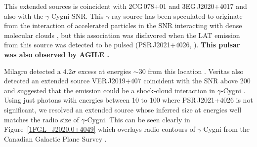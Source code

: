\documentclass[12pt,preprint]{aastex}
\newcommand{\gev}{\text{GeV}\xspace}
\newcommand{\tev}{\text{TeV}\xspace}
\newcommand{\newtext}[1]{{\bfseries \color{red}#1}}
\begin{document}
This extended sources is coincident with 2CG\,078+01 and
3EG\,J2020+4017 \citep{second_cos_b_catalog,third_egret_catalog}
and also with the $\gamma$-Cygni SNR. This $\gamma$-ray source has
been speculated to originate from the interaction of accelerated
particles in the SNR interacting with dense molecular clouds
\citep{pollock_1985,gaisser_1998},  but this association was disfavored
when the LAT \gev emission from this source was detected to be pulsed
(PSR\,J2021+4026, \cite{first_lat_pulsar_cat}). 
\newtext{
This
pulsar was also observed by AGILE \citep{gamma_cygni_agile}.
}


Milagro detected a $4.2\sigma$ excess at energies $\sim 30$ \tev
from this location \citep{lat_bsl,milagro_bright_source_list}.
Veritas also detected an extended source VER\,J2019+407 coincident
with the SNR above 200 \gev and suggested that the \tev emission could be a
shock-cloud interaction in $\gamma$-Cygni \citep{veritas_gamma_cygni}.
Using just photons with energies between 10 \gev to 100 \gev 
where
PSR\,J2021+4026 is not significant, we resolved an extended source whose inferred size at
\gev energies well matches the radio size of $\gamma$-Cygni. This can
be seen clearly in Figure~\ref{1FGL_J2020.0+4049} which overlays radio
contours of $\gamma$-Cygni from the Canadian Galactic Plane Survey
\citep{canadian_galactic_plane_survey}.



\end{document}
